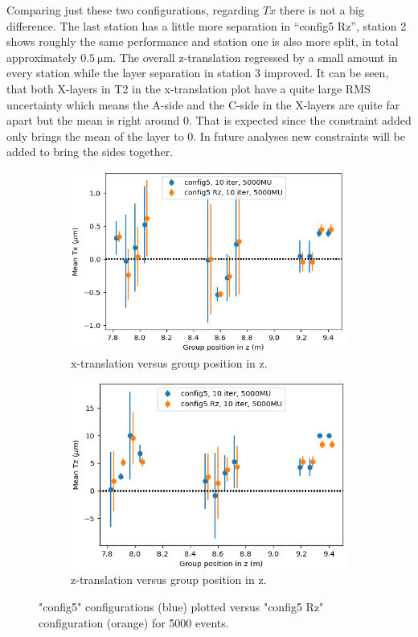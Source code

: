 Comparing just these two configurations, regarding $Tx$ there is not a big difference.
The last station has a little more separation in ``config5 Rz'', station 2 shows roughly the same performance and station one is also more split, in total approximately
$\SI{0.5}{\micro\metre}$. The overall z-translation regressed by a small amount in every station while the layer separation in station 3 improved.
It can be seen, that both X-layers in T2 in the x-translation plot have a quite large RMS uncertainty which means the A-side and the C-side in the X-layers are quite far apart but the mean is right around 0. That is expected since the constraint added only brings the mean of the layer to 0. In future analyses new constraints will be added to bring the sides together.
\begin{figure}
  \centering
  \begin{subfigure}[b]{0.48\textwidth}
    \centering
    \includegraphics[width=\textwidth]{plots/renewed_plots/Tx_config5.png}
    \caption{x-translation versus group position in z.}
    \label{fig:config5_Tx}
  \end{subfigure}
  \hfill
  \begin{subfigure}[b]{0.48\textwidth}
    \centering
    \includegraphics[width=\textwidth]{plots/renewed_plots/Tz_config5.png}
    \caption{z-translation versus group position in z.}
    \label{fig:config5_Tz}
  \end{subfigure}
  \caption{"config5" configurations (blue) plotted versus "config5 Rz" configuration (orange) for 5000 events.}
  \label{fig:config5_tra}
\end{figure}

